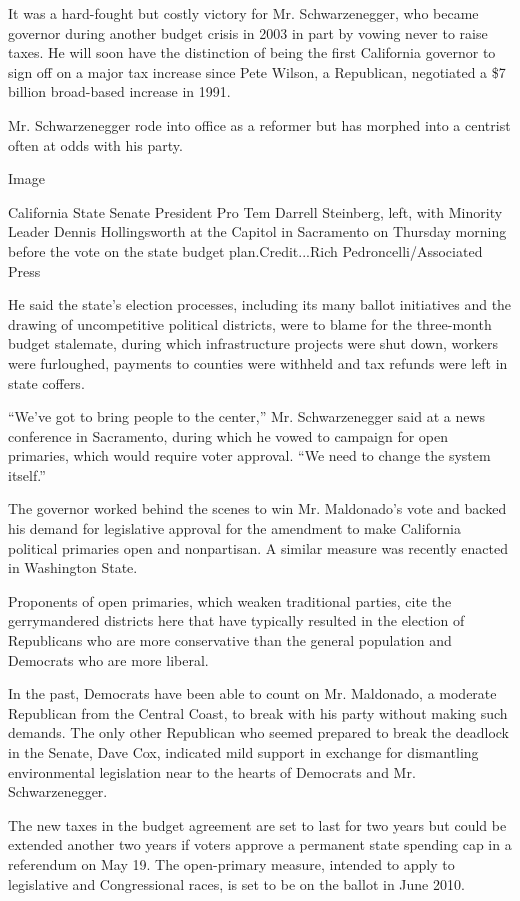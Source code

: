 It was a hard-fought but costly victory for Mr. Schwarzenegger, who
became governor during another budget crisis in 2003 in part by vowing
never to raise taxes. He will soon have the distinction of being the
first California governor to sign off on a major tax increase since Pete
Wilson, a Republican, negotiated a \$7 billion broad-based increase in
1991.

Mr. Schwarzenegger rode into office as a reformer but has morphed into a
centrist often at odds with his party.

Image

California State Senate President Pro Tem Darrell Steinberg, left, with
Minority Leader Dennis Hollingsworth at the Capitol in Sacramento on
Thursday morning before the vote on the state budget plan.Credit...Rich
Pedroncelli/Associated Press

He said the state's election processes, including its many ballot
initiatives and the drawing of uncompetitive political districts, were
to blame for the three-month budget stalemate, during which
infrastructure projects were shut down, workers were furloughed,
payments to counties were withheld and tax refunds were left in state
coffers.

``We've got to bring people to the center,'' Mr. Schwarzenegger said at
a news conference in Sacramento, during which he vowed to campaign for
open primaries, which would require voter approval. ``We need to change
the system itself.''

The governor worked behind the scenes to win Mr. Maldonado's vote and
backed his demand for legislative approval for the amendment to make
California political primaries open and nonpartisan. A similar measure
was recently enacted in Washington State.

Proponents of open primaries, which weaken traditional parties, cite the
gerrymandered districts here that have typically resulted in the
election of Republicans who are more conservative than the general
population and Democrats who are more liberal.

In the past, Democrats have been able to count on Mr. Maldonado, a
moderate Republican from the Central Coast, to break with his party
without making such demands. The only other Republican who seemed
prepared to break the deadlock in the Senate, Dave Cox, indicated mild
support in exchange for dismantling environmental legislation near to
the hearts of Democrats and Mr. Schwarzenegger.

The new taxes in the budget agreement are set to last for two years but
could be extended another two years if voters approve a permanent state
spending cap in a referendum on May 19. The open-primary measure,
intended to apply to legislative and Congressional races, is set to be
on the ballot in June 2010.

